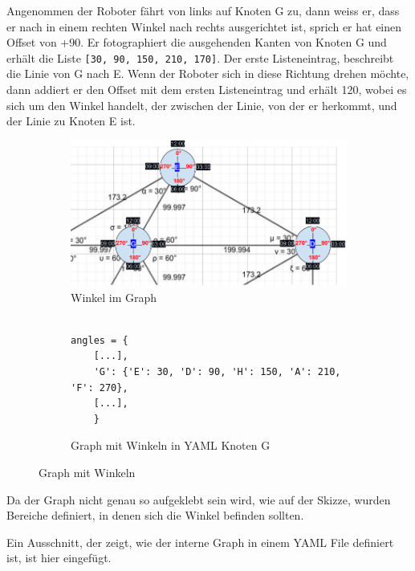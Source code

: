 Angenommen der Roboter fährt von links auf Knoten G zu, dann weiss er, dass er nach in einem rechten Winkel nach rechts ausgerichtet ist, sprich er hat einen Offset von +90\textdegree. Er fotographiert die ausgehenden Kanten von Knoten G und erhält die Liste \verb|[30, 90, 150, 210, 170]|. Der erste Listeneintrag, beschreibt die Linie von G nach E. Wenn der Roboter sich in diese Richtung drehen möchte, dann addiert er den Offset mit dem ersten Listeneintrag und erhält 120\textdegree, wobei es sich um den Winkel handelt, der zwischen der Linie, von der er herkommt, und der Linie zu Knoten E ist.

\begin{figure}[H]
\centering
\begin{subfigure}{0.98\textwidth}
\centering
\includegraphics[width=0.95\linewidth]{assets/informatik-prototyp/simulator/internal-angles.png} 
\caption{Winkel im Graph}
\label{fig:labeled-graph-angles}
\end{subfigure}
\begin{subfigure}{0.8\textwidth}
\begin{footnotesize}
\begin{verbatim}

angles = {
    [...],
    'G': {'E': 30, 'D': 90, 'H': 150, 'A': 210, 'F': 270},
    [...],
    }
\end{verbatim}
\end{footnotesize}
\caption{Graph mit Winkeln in YAML Knoten G}
\label{fig:graph-yaml-angle}
\end{subfigure}
\caption{Graph mit Winkeln}
\label{fig:angle-graphs-internal}
\end{figure}

Da der Graph nicht genau so aufgeklebt sein wird, wie auf der Skizze, wurden Bereiche definiert, in denen sich die Winkel befinden sollten.

Ein Ausschnitt, der zeigt, wie der interne Graph in einem YAML File definiert ist, ist hier eingefügt.


